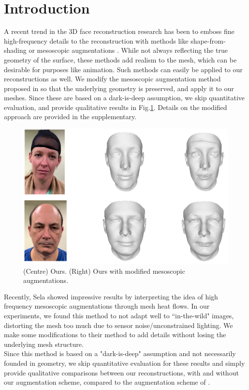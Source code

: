 
\section{Introduction}
A recent trend in the 3D face reconstruction research has been to emboss fine high-frequency details to the reconstruction with methods like shape-from-shading \cite{or2015rgbd} or mesoscopic augmentations \cite{beeler2010high}. While not always reflecting the true geometry of the surface, these methods add realism to the mesh, which can be desirable for purposes like animation. Such methods can easily be applied to our reconstructions as well. We modify the mesoscopic augmentation method proposed in \cite{sela2017unrestricted} so that the underlying geometry is preserved, and apply it to our meshes. Since these are based on a dark-is-deep assumption, we skip quantitative evaluation, and provide qualitative results in Fig.\ref{fig:high_freq}. Details on the modified approach are provided in the supplementary.

 \begin{figure}
\begin{center}
  \includegraphics[width=0.8\linewidth]{images/meso_new.png}
\end{center}
  \caption{(Centre) Ours. (Right) Ours with modified mesoscopic augmentations.}
\label{fig:high_freq}
\end{figure}
Recently, Sela \etal\cite{sela2017unrestricted} showed impressive results by interpreting the idea of high frequency mesoscopic augmentations \cite{beeler2010high} through mesh heat flows. In our experiments, we found this method to not adapt well to ``in-the-wild" images, distorting the mesh too much due to sensor noise/unconstrained lighting. We make some modifications to their method to add details without losing the underlying mesh structure.\\
Since this method is based on a "dark-is-deep" assumption and not necessarily founded in geometry, we skip quantitative evaluation for these results and simply provide qualitative comparisons between our reconstructions, with and without our augmentation scheme, compared to the augmentation scheme of \cite{sela2017unrestricted}.

